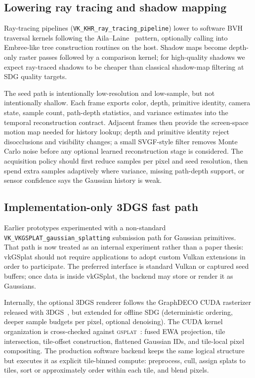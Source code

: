 \documentclass[10pt,journal,onecolumn]{IEEEtran}
\begin{document}
\subsection{Lowering ray tracing and shadow mapping}

Ray-tracing pipelines (\texttt{VK\_KHR\_ray\_tracing\_pipeline}) lower to
software BVH traversal kernels following the
Aila--Laine~\cite{aila2009understanding} pattern, optionally calling
into Embree-like tree construction routines on the host. Shadow maps
become depth-only raster passes followed by a comparison kernel; for
high-quality shadows we expect ray-traced shadows to be cheaper than
classical shadow-map filtering at SDG quality targets.

The seed path is intentionally low-resolution and low-sample, but not
intentionally shallow. Each frame exports color, depth, primitive identity,
camera state, sample count, path-depth statistics, and variance estimates into
the temporal reconstruction contract. Adjacent frames then provide the
screen-space motion map needed for history lookup; depth and primitive identity
reject disocclusions and visibility changes; a small SVGF-style filter removes
Monte Carlo noise before any optional learned reconstruction stage is
considered. The acquisition policy should first reduce samples per pixel and
seed resolution, then spend extra samples adaptively where variance, missing
path-depth support, or sensor confidence says the Gaussian history is weak.

\subsection{Implementation-only 3DGS fast path}\label{sec:v1}

Earlier prototypes experimented with a non-standard
\texttt{VK\_VKGSPLAT\_gaussian\_splatting} submission path for Gaussian
primitives. That path is now treated as an internal experiment rather than a
paper thesis: vkGSplat should not require applications to adopt custom Vulkan
extensions in order to participate. The preferred interface is standard Vulkan
or captured seed buffers; once data is inside vkGSplat, the backend may store or
render it as Gaussians.

Internally, the optional 3DGS renderer follows the GraphDECO CUDA rasterizer
released with 3DGS~\cite{kerbl20233dgs}, but extended for offline SDG
(deterministic ordering, deeper sample budgets per pixel, optional denoising).
The CUDA kernel organization is cross-checked against
\textsc{gsplat}~\cite{ye2024gsplat}: fused EWA projection, tile intersection,
tile-offset construction, flattened Gaussian IDs, and tile-local pixel
compositing. The production software backend keeps the same logical structure
but executes it as explicit tile-binned compute: preprocess, cull, assign splats
to tiles, sort or approximately order within each tile, and blend pixels.
\end{document}
